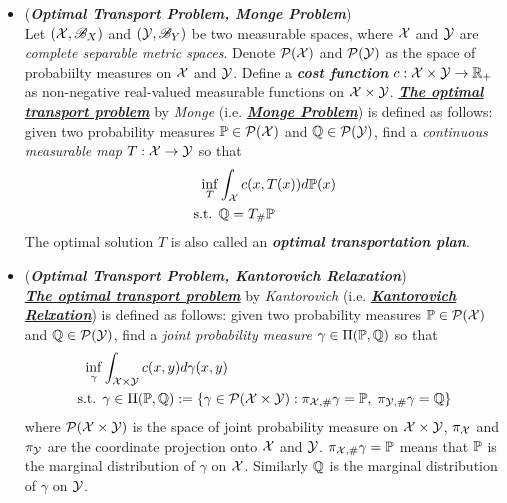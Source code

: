 \documentclass[11pt]{article}
\begin{document}
\begin{itemize}
\item \begin{definition} (\textbf{\emph{Optimal Transport Problem, Monge Problem}}) \citep{villani2009optimal, santambrogio2015optimal, gabriel2019computational} \\
Let $({\mathcal X}, {\mathscr B}_X)$ and $({\mathcal Y}, {\mathscr B}_Y)$ be two measurable spaces, where ${\mathcal X}$ and ${\mathcal Y}$ are \emph{complete separable metric spaces}. Denote ${\mathcal P}({\mathcal X})$ and ${\mathcal P}({\mathcal Y})$ as the space of probabiilty measures on ${\mathcal X}$ and ${\mathcal Y}$. Define a \emph{\textbf{cost function}} $c: {\mathcal X} \times {\mathcal Y} \to {\mathbb R}_{+}$ as non-negative real-valued measurable functions on ${\mathcal X} \times {\mathcal Y}$. \underline{\emph{\textbf{The optimal transport problem}}} by \emph{Monge} (i.e. \underline{\emph{\textbf{Monge Problem}}}) is defined as follows: given two probability measures ${\mathbb P} \in {\mathcal P}({\mathcal X})$ and ${\mathbb Q} \in {\mathcal P}({\mathcal Y})$, find a \emph{continuous measurable map} $T: {\mathcal X} \to {\mathcal Y}$ so that 
\begin{align*}
\inf_{T} & \int_{{\mathcal X}} c(x, T(x)) d{\mathbb P}(x) \\
\text{s.t. }& {\mathbb Q} = T_{\#}{\mathbb P}
\end{align*} The optimal solution $T$ is also called an \emph{\textbf{optimal transportation plan}}.
\end{definition}

\item \begin{definition} (\textbf{\emph{Optimal Transport Problem, Kantorovich Relaxation}}) \citep{villani2009optimal, santambrogio2015optimal, gabriel2019computational} \\
 \underline{\emph{\textbf{The optimal transport problem}}} by \emph{Kantorovich} (i.e. \underline{\emph{\textbf{Kantorovich Relxation}}}) is defined as follows: given two probability measures ${\mathbb P} \in {\mathcal P}({\mathcal X})$ and ${\mathbb Q} \in {\mathcal P}({\mathcal Y})$, find a \emph{joint probability measure} $\gamma \in \Pi({\mathbb P}, {\mathbb Q})$ so that 
\begin{align*}
\inf_{\gamma}  & \int_{{\mathcal X} \times {\mathcal Y}} c(x, y) d\gamma(x, y) \\
\text{s.t. }&\gamma \in \Pi({\mathbb P}, {\mathbb Q}) := \left\{\gamma \in {\mathcal P}({\mathcal X} \times {\mathcal Y}): \pi_{{\mathcal X}, \#}\gamma = {\mathbb P}, \; \pi_{{\mathcal Y}, \#}\gamma = {\mathbb Q} \right\}
\end{align*} where ${\mathcal P}({\mathcal X} \times {\mathcal Y})$ is the space of joint probability measure on ${\mathcal X} \times {\mathcal Y}$, $\pi_{{\mathcal X}}$ and $\pi_{{\mathcal Y}}$ are the coordinate projection onto ${\mathcal X}$ and ${\mathcal Y}$. $\pi_{{\mathcal X}, \#}\gamma = {\mathbb P}$ means that ${\mathbb P}$ is the marginal distribution of $\gamma$ on ${\mathcal X}$. Similarly ${\mathbb Q}$ is the marginal distribution of $\gamma$ on ${\mathcal Y}$.


\end{definition}
\end{itemize}
\end{document}
